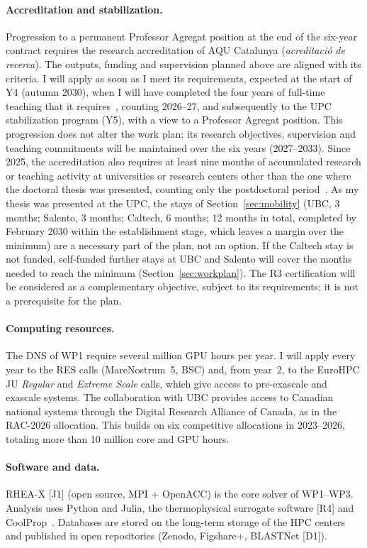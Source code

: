 \documentclass[11pt]{article}
\begin{document}
\paragraph{Accreditation and stabilization.} Progression to a permanent Professor Agregat
position at the end of the six-year contract requires the research accreditation of AQU
Catalunya (\emph{acreditaci\'o de recerca}). The outputs, funding and supervision planned
above are aligned with its criteria. I will apply as soon as I meet its requirements, expected at
the start of Y4 (autumn 2030), when I will have completed the four years of full-time teaching that
it requires~\cite{AQUProc2025}, counting 2026--27, and subsequently to the UPC stabilization program
(Y5), with a view to a Professor Agregat position. This progression does not alter the work plan:
its research objectives, supervision and teaching commitments will be maintained over the six
years (2027--2033). Since 2025, the accreditation also requires at least nine months of
accumulated research or teaching activity at universities or research centers other than the
one where the doctoral thesis was presented, counting only the postdoctoral
period~\cite{AQU2025}. As my thesis was presented at the UPC, the stays of
Section~\ref{sec:mobility} (UBC, 3 months; Salento, 3 months; Caltech, 6 months;
12 months in total, completed by February 2030 within the establishment stage, which leaves a margin over the minimum) are a necessary part of the plan, not an option. If the Caltech stay is not funded, self-funded further
stays at UBC and Salento will cover the months needed to reach the minimum (Section~\ref{sec:workplan}). The R3 certification will be considered as a complementary objective, subject
to its requirements; it is not a prerequisite for the plan.

\paragraph{Computing resources.} The DNS of WP1 require several million GPU hours per year. I will apply every year to the RES calls (MareNostrum~5, BSC) and, from year~2, to
the EuroHPC JU \emph{Regular} and \emph{Extreme Scale} calls, which give access to
pre-exascale and exascale systems. The collaboration with UBC provides access to Canadian
national systems through the Digital Research Alliance of Canada, as in the RAC-2026
allocation. This builds on six competitive allocations in 2023--2026, totaling more than 10
million core and GPU hours.

\paragraph{Software and data.} RHEA-X [J1] (open source, MPI + OpenACC) is the core solver of
WP1--WP3. Analysis uses Python and Julia, the thermophysical surrogate software [R4] and
CoolProp~\cite{CoolProp2014}. Databases are stored on the long-term storage of the HPC centers
and published in open repositories (Zenodo, Figshare+, BLASTNet [D1]).
\end{document}
